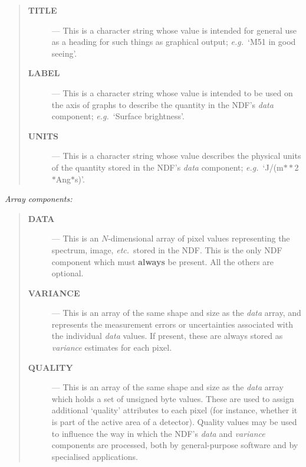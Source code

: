 \begin{quote}
\begin{description}

\item[{\bf TITLE}] --- This is a character string whose value is intended for
general use as a heading for such things as graphical output;
{\em e.g.}\ `M51 in good seeing'. 

\item[{\bf LABEL}] --- This is a character string whose value is intended to be
used on the axis of graphs to describe the quantity in the NDF's {\em data\/}
component; {\em e.g.}\ `Surface brightness'. 

\item[{\bf UNITS}] --- This is a character string whose value describes the
physical units of the quantity stored in the NDF's {\em data\/} component;
{\em e.g.}\ `J/(m$**$2$*$Ang$*$s)'. 

\end{description}
\end{quote}

{\large \em Array components:}

\begin{quote}
\begin{description}

\item[{\bf DATA}] --- This is an $N$-dimensional array of pixel values
representing the spectrum, image, {\em etc.}\ stored in the NDF. 
This is the only NDF component which must {\bf always} be present.
All the others are optional. 

\item[{\bf VARIANCE}] --- This is an array of the same shape and size as the
{\em data\/} array, and represents the measurement errors or uncertainties
associated with the individual {\em data\/} values. 
If present, these are always stored as {\em variance\/} estimates for each
pixel. 

\item[{\bf QUALITY}] --- This is an array of the same shape and size as the
{\em data\/} array which holds a set of unsigned byte values. 
These are used to assign additional `quality' attributes to each pixel (for
instance, whether it is part of the active area of a detector). 
Quality values may be used to influence the way in which the NDF's {\em data\/}
and {\em variance\/} components are processed, both by general-purpose software
and by specialised applications. 

\end{description}
\end{quote}


